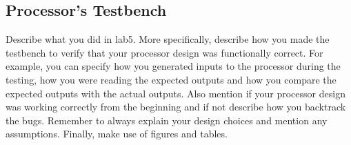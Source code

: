 \documentclass[a4paper]{article}
\begin{document}
\subsection{Processor's Testbench}
Describe what you did in lab5. More specifically, describe how you made
the testbench to verify that your processor design was functionally correct.
For example, you can specify how you generated inputs to the processor
during the testing, how you were reading the expected outputs and how
you compare the expected outputs with the actual outputs. Also mention if
your processor design was working correctly from the beginning and if not
describe how you backtrack the bugs. Remember to always explain your
design choices and mention any assumptions. Finally, make use of figures
and tables.
\end{document}
